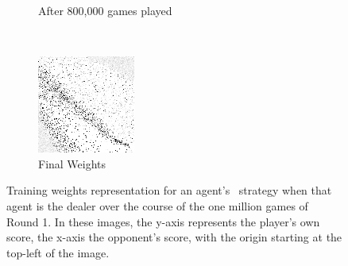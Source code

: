 \begin{figure}
\begin{subfigure}[t]{0.2\textwidth}
	\caption{After 800,000 games played}
	\end{subfigure}
	~
	\begin{subfigure}[t]{0.2\textwidth}
	\includegraphics[width=\textwidth]{images/findings/round1/flipbook_f.png}
	\caption{Final Weights}
	\end{subfigure}

\caption{%
	Training weights representation for an agent's \handmaxavg\
	strategy when that agent is the dealer
	over the course of the one million games of Round 1.
	In these images, the y-axis represents the player's own score,
	the x-axis the opponent's score,
	with the origin starting at the top-left of the image.
}
\label{fig_r1-flip}
\end{figure}
